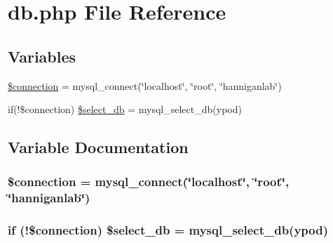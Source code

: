 \hypertarget{db_8php}{}\section{db.\+php File Reference}
\label{db_8php}
\subsection*{Variables}
\begin{DoxyCompactItemize}
\item 
\hyperlink{db_8php_a0d9c79b9b86b3f5891c6d3892f12c6a0}{\$connection} = mysql\+\_\+connect(\char`\"{}localhost\char`\"{}, \char`\"{}root\char`\"{}, \char`\"{}hanniganlab\char`\"{})
\item 
if(!\$connection) \hyperlink{db_8php_ae4ab08279bc5a147a42eb8409feece2e}{\$select\+\_\+db} = mysql\+\_\+select\+\_\+db(\textquotesingle{}ypod\textquotesingle{})
\end{DoxyCompactItemize}


\subsection{Variable Documentation}
\subsubsection[{\texorpdfstring{\$connection}{$connection}}]{\setlength{\rightskip}{0pt plus 5cm}\$connection = mysql\+\_\+connect(\char`\"{}localhost\char`\"{}, \char`\"{}root\char`\"{}, \char`\"{}hanniganlab\char`\"{})}\hypertarget{db_8php_a0d9c79b9b86b3f5891c6d3892f12c6a0}{}\label{db_8php_a0d9c79b9b86b3f5891c6d3892f12c6a0}
\subsubsection[{\texorpdfstring{\$select\+\_\+db}{$select_db}}]{\setlength{\rightskip}{0pt plus 5cm}if (!\$connection) \$select\+\_\+db = mysql\+\_\+select\+\_\+db(\textquotesingle{}ypod\textquotesingle{})}\hypertarget{db_8php_ae4ab08279bc5a147a42eb8409feece2e}{}\label{db_8php_ae4ab08279bc5a147a42eb8409feece2e}
